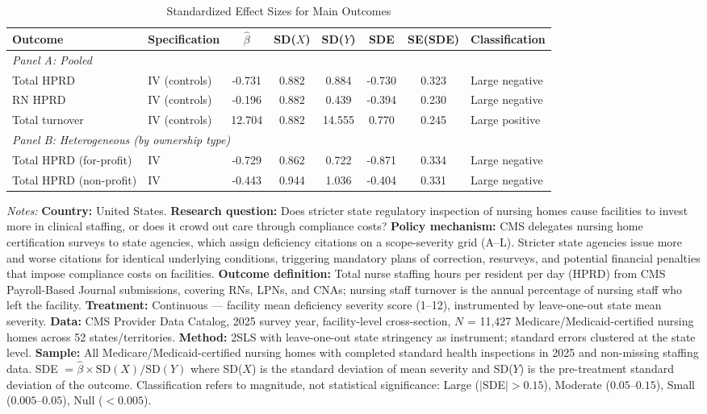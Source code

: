 \begin{table}[H]
\centering
\caption{Standardized Effect Sizes for Main Outcomes}
\label{tab:sde}
\begin{adjustbox}{max width=\textwidth}
\begin{tabular}{llcccccl}
\toprule
Outcome & Specification & $\hat{\beta}$ & SD($X$) & SD($Y$) & SDE & SE(SDE) & Classification \\
\midrule
\multicolumn{8}{l}{\textit{Panel A: Pooled}} \\[3pt]
Total HPRD & IV (controls) & -0.731 & 0.882 & 0.884 & -0.730 & 0.323 & Large negative \\
RN HPRD & IV (controls) & -0.196 & 0.882 & 0.439 & -0.394 & 0.230 & Large negative \\
Total turnover & IV (controls) & 12.704 & 0.882 & 14.555 & 0.770 & 0.245 & Large positive \\[3pt]
\midrule
\multicolumn{8}{l}{\textit{Panel B: Heterogeneous (by ownership type)}} \\[3pt]
Total HPRD (for-profit) & IV & -0.729 & 0.862 & 0.722 & -0.871 & 0.334 & Large negative \\
Total HPRD (non-profit) & IV & -0.443 & 0.944 & 1.036 & -0.404 & 0.331 & Large negative \\
\bottomrule
\end{tabular}
\end{adjustbox}
\par\vspace{0.3em}
{\scriptsize \textit{Notes:} \textbf{Country:} United States. \textbf{Research question:} Does stricter state regulatory inspection of nursing homes cause facilities to invest more in clinical staffing, or does it crowd out care through compliance costs? \textbf{Policy mechanism:} CMS delegates nursing home certification surveys to state agencies, which assign deficiency citations on a scope-severity grid (A--L). Stricter state agencies issue more and worse citations for identical underlying conditions, triggering mandatory plans of correction, resurveys, and potential financial penalties that impose compliance costs on facilities. \textbf{Outcome definition:} Total nurse staffing hours per resident per day (HPRD) from CMS Payroll-Based Journal submissions, covering RNs, LPNs, and CNAs; nursing staff turnover is the annual percentage of nursing staff who left the facility. \textbf{Treatment:} Continuous --- facility mean deficiency severity score (1--12), instrumented by leave-one-out state mean severity. \textbf{Data:} CMS Provider Data Catalog, 2025 survey year, facility-level cross-section, $N$ = 11,427 Medicare/Medicaid-certified nursing homes across 52 states/territories. \textbf{Method:} 2SLS with leave-one-out state stringency as instrument; standard errors clustered at the state level. \textbf{Sample:} All Medicare/Medicaid-certified nursing homes with completed standard health inspections in 2025 and non-missing staffing data. SDE $= \hat{\beta} \times \text{SD}(X) / \text{SD}(Y)$ where SD($X$) is the standard deviation of mean severity and SD($Y$) is the pre-treatment standard deviation of the outcome. Classification refers to magnitude, not statistical significance: Large ($|$SDE$| > 0.15$), Moderate ($0.05$--$0.15$), Small ($0.005$--$0.05$), Null ($< 0.005$).}
\end{table}
